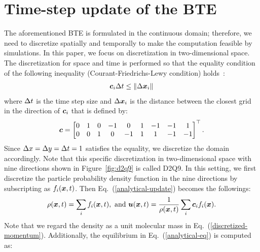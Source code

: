 \section{Time-step update of the BTE}
The aforementioned BTE is formulated in the 
continuous domain; therefore,
we need to discretize spatially and 
temporally to make the computation 
feasible by simulations.
In this paper, we focus on discretization
in two-dimensional space.
The discretization for space and time
is performed so that the equality condition of 
the following inequality
(Courant-Friedrichs-Lewy condition) holds~\cite{peyretcomputational, sterling1996stability}:
\begin{equation*}
\begin{aligned}
  \boldsymbol{c}_i \Delta t \leq \| \Delta \boldsymbol{x}_i \|
\end{aligned}
\end{equation*}
where $\Delta t$ is the time step size 
and $\Delta \boldsymbol{x}_i$ is the distance between 
the closest grid in the direction
of $\boldsymbol{c}_i$ that is defined by:
\begin{equation}
\begin{aligned}
  \boldsymbol{c} = \begin{bmatrix}
    0 & 1 & 0 & -1 & 0 & 1 & -1 & -1 & 1 \\
    0 & 0 & 1 & 0 & -1 & 1 & 1 & -1 & -1 \\
  \end{bmatrix}^\top.
\end{aligned}
\label{d2q9-velocity}
\end{equation}
Since $\Delta x = \Delta y = \Delta t = 1$ satisfies the equality, 
we discretize the domain accordingly.
Note that this specific discretization in two-dimensional
space with nine directions shown in 
Figure~\ref{fig:d2q9} is called D2Q9.
In this setting, 
we first discretize
the particle probability density function
in the nine directions by subscripting 
as $f_i(\boldsymbol{x}, t)$.
Then Eq.~(\ref{analytical-update}) becomes the followings:
\begin{equation}
  \begin{aligned}
    \rho(\boldsymbol{x}, t) = \sum_i f_i(\boldsymbol{x}, t), \text{ and }
    \boldsymbol{u}(\boldsymbol{x}, t) = 
    \frac{1}{\rho(\boldsymbol{x}, t)} \sum_i \boldsymbol{c}_i f_i(\boldsymbol{x}). \\
  \end{aligned}
  \label{discretized-momentum}
\end{equation}
Note that we regard the density as
a unit molecular mass in Eq.~(\ref{discretized-momentum}).
Additionally, the equilibrium in Eq.~(\ref{analytical-eq}) is computed as:
